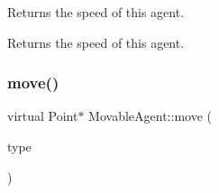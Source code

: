 Returns the speed of this agent. \begin{DoxyReturn}{Returns}
the speed of this agent. 
\end{DoxyReturn}
\mbox{\label{class_movable_agent_a35299e133c6787689b553d74ce5f98f0}} 
\subsubsection{\texorpdfstring{move()}{move()}}
{\footnotesize\ttfamily virtual Point$\ast$ Movable\+Agent\+::move (\begin{DoxyParamCaption}\item[{\mbox{\hyperlink{_movement_type_8h_a8a93b61bc797a7d1907f42796a252493}{Movement\+Type}}}]{type }\end{DoxyParamCaption})\hspace{0.3cm}{\ttfamily [pure virtual]}}

